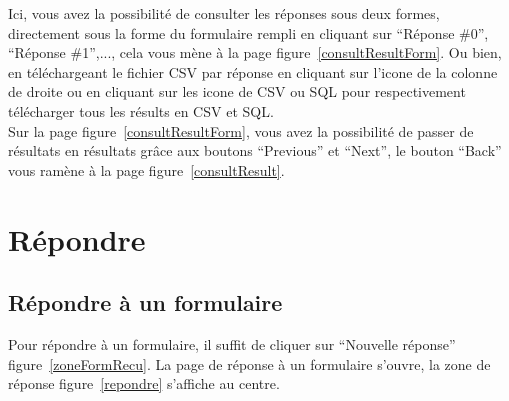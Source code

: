 \documentclass[a4paper,11pt,final]{report}
\begin{document}
Ici, vous avez la possibilité de consulter les réponses sous deux formes, directement sous la forme du formulaire rempli en cliquant sur ``Réponse \#0'', ``Réponse \#1'',..., cela vous mène à la page figure~\ref{consultResultForm}. Ou bien, en téléchargeant le fichier CSV par réponse en cliquant sur l'icone de la colonne de droite ou en cliquant sur les icone de CSV ou SQL pour respectivement télécharger tous les résults en CSV et SQL.\\
Sur la page figure~\ref{consultResultForm}, vous avez la possibilité de passer de résultats en résultats grâce aux boutons ``Previous'' et ``Next'', le bouton ``Back'' vous ramène à la page figure~\ref{consultResult}.

\noindent\begin{minipage}{\linewidth}%
\label{consultResultForm}
\end{minipage}


\chapter{Répondre}
\section{Répondre à un formulaire}
Pour répondre à un formulaire, il suffit de cliquer sur ``Nouvelle réponse'' figure~\ref{zoneFormRecu}. La page de réponse à un formulaire s'ouvre, la zone de réponse figure~\ref{repondre} s'affiche au centre.
\end{document}
